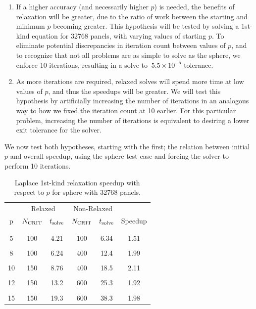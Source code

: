 \begin{enumerate}
\item If a higher accuracy (and necessarily higher $p$) is needed, the benefits of relaxation will be greater, due to the ratio of work between the starting and minimum $p$ becoming greater. This hypothesis will be tested by solving a 1st-kind equation for 32768 panels, with varying values of starting $p$. To eliminate potential discrepancies in iteration count between values of $p$, and to recognize that not all problems are as simple to solve as the sphere, we enforce 10 {\gmres} iterations, resulting in a solve to $~5.5\times 10^{-5}$ tolerance. %

\item As more iterations are required, relaxed solves will spend more time at low values of $p$, and thus the speedups will be greater. We will test this hypothesis by artificially increasing the number of iterations in an analogous way to how we fixed the iteration count at 10 earlier. For this particular problem, increasing the number of iterations is equivalent to desiring a lower exit tolerance for the solver. 
\end{enumerate}

We now test both hypotheses, starting with the first; the relation between initial $p$ and overall speedup, using the sphere test case and forcing the solver to perform 10 iterations.



\begin{table}[h]
\begin{center}
\begin{tabular}{c|cc|cc|c}
  & \multicolumn{2}{c|}{Relaxed} & \multicolumn{2}{c|}{Non-Relaxed} & \\
  p & $N_{\text{CRIT}}$ & $t_{\text{solve}}$ & $N_{\text{CRIT}}$ & $t_{\text{solve}}$ & Speedup \\
   & & & & & \\ \hline
   & & & & & \\
  5 & 100 & 4.21 & 100 & 6.34 & 1.51 \\
   & & & & & \\
  8 & 100 & 6.24 & 400 & 12.4 & 1.99 \\
   & & & & & \\
  10 & 150 & 8.76 & 400 & 18.5 & 2.11 \\
   & & & & & \\
  12 & 150 & 13.2  & 600 & 25.3 & 1.92 \\
   & & & & & \\
  15 & 150 & 19.3 & 600 & 38.3 & 1.98 \\
 
\end{tabular}
\end{center}
\caption{Laplace 1st-kind relaxation speedup with respect to $p$ for sphere with 32768 panels.}
\label{tab:laplace_1st_p_relaxation}
\end{table}%

